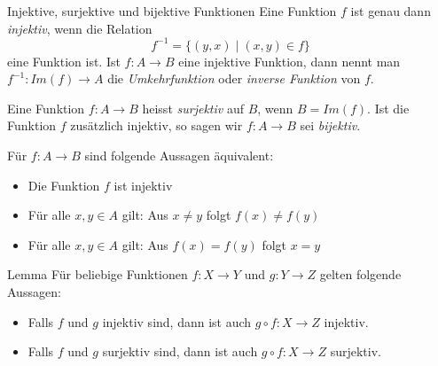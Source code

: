 \begin{definition}{Injektive, surjektive und bijektive Funktionen}
    Eine Funktion $f$ ist genau dann \emph{injektiv}, wenn die Relation \[f^{-1} = \{(y,x) \mid (x,y) \in f\}\] eine Funktion ist.
    Ist $f : A \rightarrow B$ eine injektive Funktion, dann nennt man $f^{-1} : Im(f) \rightarrow A$ die \emph{Umkehrfunktion} oder \emph{inverse Funktion} von $f$.

    Eine Funktion $f : A \rightarrow B$ heisst \emph{surjektiv} auf $B$, wenn $B = Im(f)$.
    Ist die Funktion $f$ zusätzlich injektiv, so sagen wir $f : A \rightarrow B$ sei \emph{bijektiv}.
\end{definition}

\begin{subbox}{}
    Für $f : A \rightarrow B$ sind folgende Aussagen äquivalent:
    \begin{itemize}
        \item Die Funktion $f$ ist injektiv
        \item Für alle $x,y \in A$ gilt: Aus $x \neq y$ folgt $f(x) \neq f(y)$
        \item Für alle $x,y \in A$ gilt: Aus $f(x) = f(y)$ folgt $x = y$
    \end{itemize}
\end{subbox}

\begin{subbox}{Lemma}
    Für beliebige Funktionen $f : X \rightarrow Y$ und $g : Y \rightarrow Z$ gelten folgende Aussagen:
    \begin{itemize}
        \item Falls $f$ und $g$ injektiv sind, dann ist auch $g \circ f : X \rightarrow Z$ injektiv.
        \item Falls $f$ und $g$ surjektiv sind, dann ist auch $g \circ f: X \rightarrow Z$ surjektiv.
    \end{itemize}
\end{subbox}

